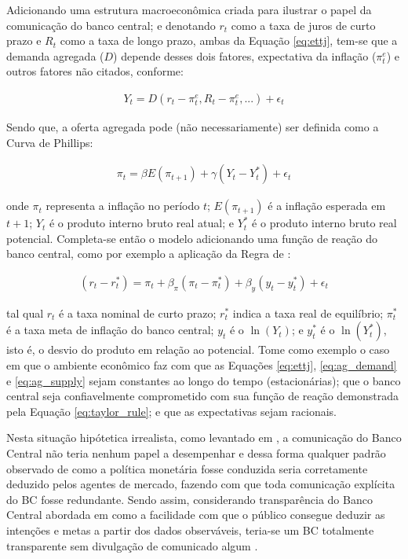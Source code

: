 Adicionando uma estrutura macroeconômica criada para ilustrar o papel da comunicação do banco central; e denotando $r_{t}$ como a taxa de juros de curto prazo e $R_{t}$ como a taxa de longo prazo, ambas da Equação \eqref{eq:ettj}, tem-se que a demanda agregada ($D$) depende desses dois fatores, expectativa da inflação ($\pi_{t}^e$) e outros fatores não citados, conforme:

\begin{ceqn}
\begin{align} \label{eq:ag_demand}
Y_{t} = D(r_{t} -\pi_{t}^e, R_{t} - \pi_{t}^e,...) + \epsilon_{t}
\end{align}
\end{ceqn} 

Sendo que, a oferta agregada pode (não necessariamente) ser definida  como a Curva de Phillips:

\begin{ceqn}
\begin{align} \label{eq:ag_supply}
\pi_{t} = \beta E(\pi_{t+1}) + \gamma (Y_{t} - Y_{t}^*) + \epsilon_{t}
\end{align}
\end{ceqn} onde $\pi_{t}$ representa a inflação no período $t$; $E(\pi_{t+1})$ é a inflação esperada em $t+1$; $Y_{t}$ é o produto interno bruto real atual; e $Y_{t}^*$ é o produto interno bruto real potencial. Completa-se então o modelo adicionando uma função de reação do banco central, como por exemplo a aplicação da Regra de :

\begin{ceqn}
\begin{align} \label{eq:taylor_rule}
(r_{t} - r_{t}^*) = \pi_{t} + \beta_{\pi} (\pi_{t} - \pi_{t}^*) + \beta_{y} (y_{t} - y_{t}^*) + \epsilon_{t}
\end{align}
\end{ceqn} tal qual $r_{t}$ é a taxa nominal de curto prazo; $r_{t}^*$ indica a taxa real de equilíbrio; $\pi_{t}^*$ é a taxa meta de inflação do banco central; $y_{t}$ é o $\ln(Y_{t})$; e $y_{t}^*$ é o $\ln(Y_{t}^*)$, isto é, o desvio do produto em relação ao potencial. Tome como exemplo o caso em que o ambiente econômico faz com que as Equações \eqref{eq:ettj}, \eqref{eq:ag_demand} e \eqref{eq:ag_supply} sejam constantes ao longo do tempo (estacionárias); que o banco central seja confiavelmente comprometido com sua função de reação demonstrada pela Equação \eqref{eq:taylor_rule}; e que as expectativas sejam racionais. 

Nesta situação hipótetica irrealista, como levantado em , a comunicação do Banco Central não teria nenhum papel a desempenhar e dessa forma qualquer padrão observado de como a política monetária fosse conduzida seria corretamente deduzido pelos agentes de mercado, fazendo com que toda comunicação explícita do BC fosse redundante. Sendo assim, considerando transparência do Banco Central abordada em  como a facilidade com que o público consegue deduzir as intenções e metas a partir dos dados observáveis, teria-se um BC totalmente transparente sem divulgação de comunicado algum \cite{blinder2008central}.

